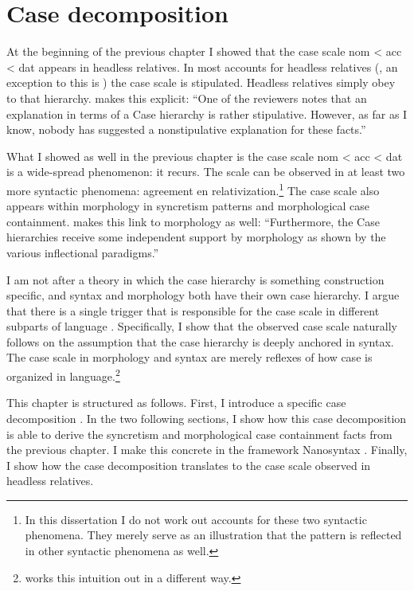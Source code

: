 
\chapter{Case decomposition}\label{ch:decomposition}

At the beginning of the previous chapter I showed that the case scale \ac{nom} < \ac{acc} < \ac{dat} appears in headless relatives. In most accounts for headless relatives (\citealt[cf.][]{pittner1995,vogel2001,grosu2003,harbert1978}, an exception to this is \citealt{himmelreich2017}) the case scale is stipulated. Headless relatives simply obey to that hierarchy.  makes this explicit: ``One of the reviewers notes that an explanation in terms of a Case hierarchy is rather stipulative. However, as far as I know, nobody has suggested a nonstipulative explanation for these facts.''

What I showed as well in the previous chapter is the case scale \ac{nom} < \ac{acc} < \ac{dat} is a wide-spread phenomenon: it recurs. The scale can be observed in at least two more syntactic phenomena: agreement en relativization.\footnote{
In this dissertation I do not work out accounts for these two syntactic phenomena. They merely serve as an illustration that the pattern is reflected in other syntactic phenomena as well.}
The case scale also appears within morphology in syncretism patterns and morphological case containment.  makes this link to morphology as well: ``Furthermore, the Case hierarchies receive some independent support by morphology as shown by the various inflectional paradigms.''

I am not after a theory in which the case hierarchy is something construction specific, and syntax and morphology both have their own case hierarchy. I argue that there is a single trigger that is responsible for the case scale in different subparts of language \citep[cf.][on numeral constructions]{caha2019}. Specifically, I show that the observed case scale naturally follows on the assumption that the case hierarchy is deeply anchored in syntax. The case scale in morphology and syntax are merely reflexes of how case is organized in language.\footnote{
\citet{himmelreich2017} works this intuition out in a different way.
}

This chapter is structured as follows. First, I introduce a specific case decomposition \citep{caha2009}. In the two following sections, I show how this case decomposition is able to derive the syncretism and morphological case containment facts from the previous chapter. I make this concrete in the framework Nanosyntax \citep{starke2009}. Finally, I show how the case decomposition translates to the case scale observed in headless relatives.


